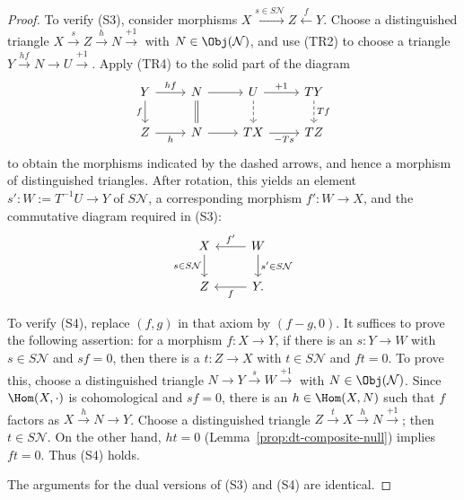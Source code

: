 \begin{proof}
	To verify (S3), consider morphisms
	$X \xrightarrow{s \in S\mathcal{N}} Z \xleftarrow{f} Y$. Choose a
	distinguished triangle $X \xrightarrow{s} Z \xrightarrow{h} N
	\xrightarrow{+1}$ with $N \in \Obj(\mathcal{N})$, and use (TR2) to
	choose a triangle $Y \xrightarrow{hf} N \to U \xrightarrow{+1}$. Apply
	(TR4) to the solid part of the diagram
	\[\begin{tikzcd}
		Y \arrow[r, "hf"] \arrow[d, "f"'] & N \arrow[r] \arrow[equal, d] & U \arrow[r, "+1"] \arrow[dashed, d] & TY \arrow[dashed, d, "Tf"] \\
		Z \arrow[r, "h"'] & N \arrow[r] & TX \arrow[r, "-Ts"'] & TZ
	\end{tikzcd}\]
	to obtain the morphisms indicated by the dashed arrows, and hence a
	morphism of distinguished triangles. After rotation, this yields an
	element $s': W := T^{-1} U \to Y$ of $S\mathcal{N}$, a corresponding
	morphism $f': W \to X$, and the commutative diagram required in (S3):
	\[\begin{tikzcd}
		X \arrow[d, "{s \in S\mathcal{N}}"'] & W \arrow[d, "{s' \in S\mathcal{N}}"] \arrow[l, "{f'}"'] \\
		Z & Y \arrow[l, "f"] .
	\end{tikzcd}\]

	To verify (S4), replace $(f, g)$ in that axiom by $(f-g, 0)$. It suffices
	to prove the following assertion: for a morphism $f: X \to Y$, if there
	is an $s: Y \to W$ with $s \in S\mathcal{N}$ and $sf = 0$, then there
	is a $t: Z \to X$ with $t \in S\mathcal{N}$ and $ft = 0$. To prove this,
	choose a distinguished triangle
	$N \to Y \xrightarrow{s} W \xrightarrow{+1}$ with
	$N \in \Obj(\mathcal{N})$. Since $\Hom(X, \cdot)$ is cohomological and
	$sf=0$, there is an $h \in \Hom(X, N)$ such that $f$ factors as
	$X \xrightarrow{h} N \to Y$. Choose a distinguished triangle
	$Z \xrightarrow{t} X \xrightarrow{h} N \xrightarrow{+1}$; then
	$t \in S\mathcal{N}$. On the other hand,
	$ht=0$ (Lemma~\ref{prop:dt-composite-null}) implies $ft = 0$. Thus (S4)
	holds.

	The arguments for the dual versions of (S3) and (S4) are identical.
\end{proof}

